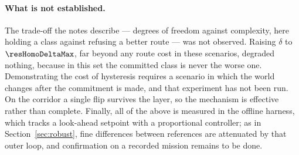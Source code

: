 \paragraph{What is not established.}
The trade-off the notes describe --- degrees of freedom against complexity, here holding a class against
refusing a better route --- was not observed. Raising $\delta$ to $\resHomoDeltaMax$, far beyond any route
cost in these scenarios, degraded nothing, because in this set the committed class is never the worse one.
Demonstrating the cost of hysteresis requires a scenario in which the world changes after the commitment is
made, and that experiment has not been run. On the corridor a single flip survives the layer, so the
mechanism is effective rather than complete. Finally, all of the above is measured in the offline harness,
which tracks a look-ahead setpoint with a proportional controller; as in Section~\ref{sec:robust}, fine
differences between references are attenuated by that outer loop, and confirmation on a recorded mission
remains to be done.
